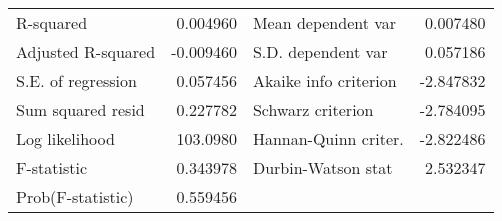 \begin{tabular}{lrrrr}
\midrule
\multicolumn{1}{l}{R-squared}&\multicolumn{1}{r}{0.004960}&\multicolumn{2}{l}{Mean dependent var}&\multicolumn{1}{r}{0.007480}\\
\multicolumn{1}{l}{Adjusted R-squared}&\multicolumn{1}{r}{-0.009460}&\multicolumn{2}{l}{S.D. dependent var}&\multicolumn{1}{r}{0.057186}\\
\multicolumn{1}{l}{S.E. of regression}&\multicolumn{1}{r}{0.057456}&\multicolumn{2}{l}{Akaike info criterion}&\multicolumn{1}{r}{-2.847832}\\
\multicolumn{1}{l}{Sum squared resid}&\multicolumn{1}{r}{0.227782}&\multicolumn{2}{l}{Schwarz criterion}&\multicolumn{1}{r}{-2.784095}\\
\multicolumn{1}{l}{Log likelihood}&\multicolumn{1}{r}{103.0980}&\multicolumn{2}{l}{Hannan-Quinn criter.}&\multicolumn{1}{r}{-2.822486}\\
\multicolumn{1}{l}{F-statistic}&\multicolumn{1}{r}{0.343978}&\multicolumn{2}{l}{Durbin-Watson stat}&\multicolumn{1}{r}{2.532347}\\
\multicolumn{1}{l}{Prob(F-statistic)}&\multicolumn{1}{r}{0.559456}&\multicolumn{1}{c}{}&\multicolumn{1}{c}{}&\multicolumn{1}{c}{}\\
\bottomrule
\end{tabular}